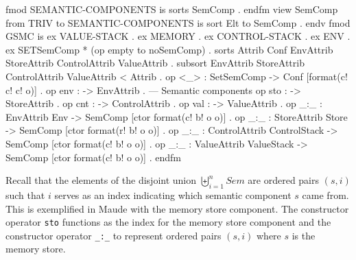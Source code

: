 \documentclass[a4paper,openany]{book}
\begin{document}
\begin{maude}[caption=Generalized SMC in Maude,label=lst:gsmc-maude]
fmod SEMANTIC-COMPONENTS is sorts SemComp . endfm
view SemComp from TRIV to SEMANTIC-COMPONENTS is sort Elt to SemComp . endv
fmod GSMC is ex VALUE-STACK . ex MEMORY . ex CONTROL-STACK . ex ENV . 
    ex SET{SemComp} * (op empty to noSemComp) .
    sorts Attrib Conf EnvAttrib StoreAttrib ControlAttrib ValueAttrib .
    subsort EnvAttrib StoreAttrib ControlAttrib ValueAttrib < Attrib  .
    op <_> : Set{SemComp} -> Conf [format(c! c! c! o)] . 
    op env : -> EnvAttrib .     --- Semantic components
    op sto : -> StoreAttrib .
    op cnt : -> ControlAttrib .
    op val : -> ValueAttrib .
    op _:_ : EnvAttrib Env -> SemComp [ctor format(c! b! o o)] .
    op _:_ : StoreAttrib Store -> SemComp [ctor format(r! b! o o)] .
    op _:_ : ControlAttrib ControlStack -> SemComp [ctor format(c! b! o o)] .
    op _:_ : ValueAttrib ValueStack -> SemComp [ctor format(c! b! o o)] .
endfm
\end{maude}

%
%
%

Recall that the elements of the disjoint union $\biguplus^n_{i=1} \mathit{Sem}$ are ordered pairs $(s, i)$ such that $i$ serves as an index indicating which semantic component $s$ came from. This is exemplified in Maude with the memory store component. %
The constructor operator \texttt{sto} functions as the index for the memory store component and the constructor operator \texttt{\_:\_} to represent ordered pairs $(s, i)$ where $s$ is the memory store.  
\end{document}

